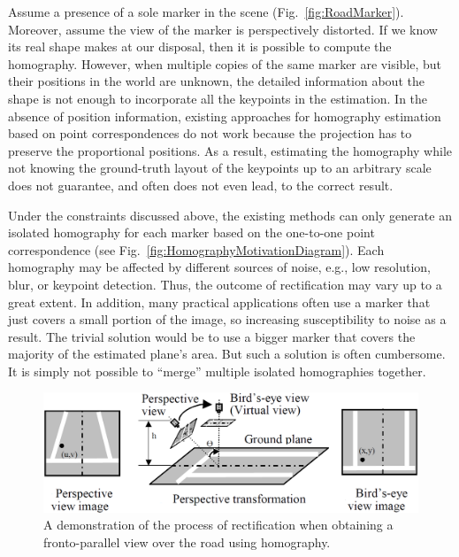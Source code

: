 Assume a presence of a sole marker in the scene (Fig.~\ref{fig:RoadMarker}). Moreover, assume the view of the marker is perspectively distorted. If we know its real shape makes at our disposal, then it is possible to compute the homography. However, when multiple copies of the same marker are visible, but their positions in the world are unknown, the detailed information about the shape is not enough to incorporate all the keypoints in the estimation. In the absence of position information, existing approaches for homography estimation based on point correspondences do not work because the projection has to preserve the proportional positions. As a result, estimating the homography while not knowing the ground-truth layout of the keypoints up to an arbitrary scale does not guarantee, and often does not even lead, to the correct result.

Under the constraints discussed above, the existing methods can only generate an isolated homography for each marker based on the one-to-one point correspondence (see Fig.~\ref{fig:HomographyMotivationDiagram}). Each homography may be affected by different sources of noise, e.g., low resolution, blur, or keypoint detection. Thus, the outcome of rectification may vary up to a great extent. In addition, many practical applications often use a marker that just covers a small portion of the image, so increasing susceptibility to noise as a result. The trivial solution would be to use a bigger marker that covers the majority of the estimated plane's area. But such a solution is often cumbersome. It is simply not possible to ``merge'' multiple isolated homographies together.

\begin{figure}[t]
    \centerline{\includegraphics[width=0.8\linewidth]{figures/homography/road_rectification.png}}
    \caption[Road rectification]{A demonstration of the process of rectification when obtaining a fronto-parallel view over the road using homography. }
    \label{fig:RoadRectification}
\end{figure}

